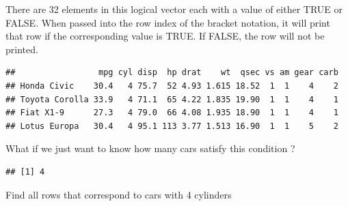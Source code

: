 \documentclass[]{book}
\newenvironment{Shaded}{\begin{snugshade}}{\end{snugshade}}
\newcommand{\DecValTok}[1]{\textcolor[rgb]{0.00,0.00,0.81}{#1}}
\newcommand{\FloatTok}[1]{\textcolor[rgb]{0.00,0.00,0.81}{#1}}
\newcommand{\KeywordTok}[1]{\textcolor[rgb]{0.13,0.29,0.53}{\textbf{#1}}}
\newcommand{\NormalTok}[1]{#1}
\newcommand{\OperatorTok}[1]{\textcolor[rgb]{0.81,0.36,0.00}{\textbf{#1}}}
\newcommand{\StringTok}[1]{\textcolor[rgb]{0.31,0.60,0.02}{#1}}
\begin{document}
There are 32 elements in this logical vector each with a value of either TRUE or FALSE. When passed into the row index of the bracket notation, it will print that row if the corresponding value is TRUE. If FALSE, the row will not be printed.

\begin{Shaded}
\end{Shaded}

\begin{verbatim}
##                 mpg cyl disp  hp drat    wt  qsec vs am gear carb
## Honda Civic    30.4   4 75.7  52 4.93 1.615 18.52  1  1    4    2
## Toyota Corolla 33.9   4 71.1  65 4.22 1.835 19.90  1  1    4    1
## Fiat X1-9      27.3   4 79.0  66 4.08 1.935 18.90  1  1    4    1
## Lotus Europa   30.4   4 95.1 113 3.77 1.513 16.90  1  1    5    2
\end{verbatim}

What if we just want to know how many cars satisfy this condition ?

\begin{Shaded}
\end{Shaded}

\begin{verbatim}
## [1] 4
\end{verbatim}

Find all rows that correspond to cars with 4 cylinders

\begin{Shaded}
\end{Shaded}
\end{document}
